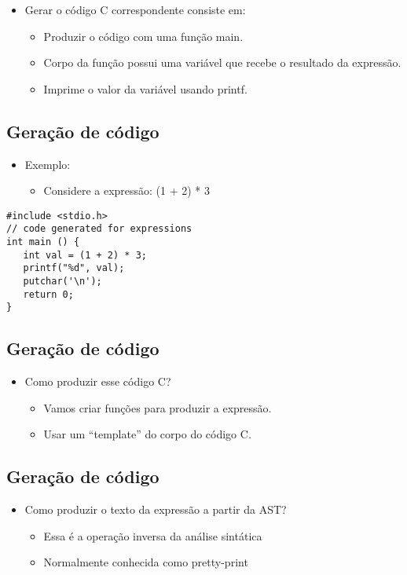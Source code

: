 \documentclass[11pt]{article}
\begin{document}
\begin{itemize}
\item Gerar o código C correspondente consiste em:
\begin{itemize}
\item Produzir o código com uma função main.
\item Corpo da função possui uma variável que recebe o resultado da expressão.
\item Imprime o valor da variável usando printf.
\end{itemize}
\end{itemize}
\subsection*{Geração de código}
\label{sec:orgb5f508a}

\begin{itemize}
\item Exemplo:
\begin{itemize}
\item Considere a expressão: (1 + 2) * 3
\end{itemize}
\end{itemize}

\begin{verbatim}
#include <stdio.h>
// code generated for expressions
int main () {
   int val = (1 + 2) * 3;
   printf("%d", val);
   putchar('\n');
   return 0;
}
\end{verbatim}
\subsection*{Geração de código}
\label{sec:org537b220}

\begin{itemize}
\item Como produzir esse código C?
\begin{itemize}
\item Vamos criar funções para produzir a expressão.
\item Usar um ``template'' do corpo do código C.
\end{itemize}
\end{itemize}
\subsection*{Geração de código}
\label{sec:org7f639f8}

\begin{itemize}
\item Como produzir o texto da expressão a partir da AST?
\begin{itemize}
\item Essa é a operação inversa da análise sintática
\item Normalmente conhecida como pretty-print
\end{itemize}
\end{itemize}
\end{document}

